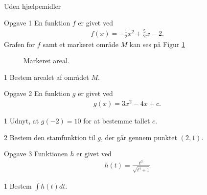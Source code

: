 \begin{center}
	\LARGE
	Uden hjælpemidler
\end{center}

\begin{opgavetekst}{Opgave 1}
	En funktion $f$ er givet ved
	\begin{align*}
		f(x) = -\frac{1}{2}x^2 + \frac{5}{2}x - 2.
	\end{align*}
	Grafen for $f$ samt et markeret område $M$ kan ses på Figur \ref{fig:opg1}
	\begin{figure}[H]
		\centering
		\caption{Markeret areal.}
		\label{fig:opg1}
	\end{figure}
	\phantom{h}
\end{opgavetekst}
\begin{delopgave}{1}
	Bestem arealet af området $M$.
\end{delopgave}

\begin{opgavetekst}{Opgave 2}
	En funktion $g$ er givet ved
	\begin{align*}
		g(x) = 3x^2 - 4x + c.
	\end{align*}
\end{opgavetekst}
\begin{delopgave}{1}
	Udnyt, at $g(-2) = 10$ for at bestemme tallet $c$.  
\end{delopgave}
\begin{delopgave}{2}
	Bestem den stamfunktion til $g$, der går gennem punktet $(2,1)$.
\end{delopgave}

\newpage

\begin{opgavetekst}{Opgave 3}
	Funktionen $h$ er givet ved
	\begin{align*}
		h(t) = \frac{t^3}{\sqrt{t^4+1}}
	\end{align*}
\end{opgavetekst}
\begin{delopgave}{1}
	Bestem $\int h(t) dt$.
\end{delopgave}

